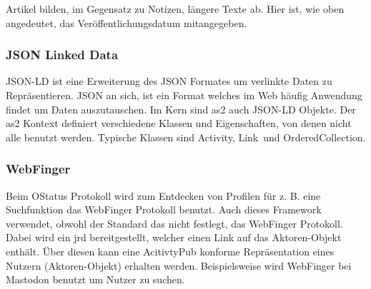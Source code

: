 {	Artikel bilden, im Gegensatz zu Notizen, längere Texte ab. Hier ist, wie oben angedeutet, das Veröffentlichungsdatum mitangegeben.\\
	
	\subsubsection{JSON Linked Data}
	\gls{JSON-LD} ist eine Erweiterung des JSON Formates um verlinkte Daten zu Repräsentieren. JSON an sich, ist ein Format welches im Web häufig Anwendung findet um Daten auszutauschen. Im Kern sind \gls{as2} auch \gls{JSON-LD} Objekte. Der \gls{as2} Kontext definiert verschiedene Klassen und Eigenschaften, von denen nicht alle benutzt werden. Typische Klassen sind \glqq Activity\grqq, \glqq Link\grqq~und \glqq OrderedCollection\grqq.\\
	
	\subsubsection{WebFinger}
	Beim OStatus Protokoll wird zum Entdecken von Profilen für z. B. eine Suchfunktion das WebFinger Protokoll benutzt. Auch dieses Framework verwendet, obwohl der Standard das nicht festlegt, das WebFinger Protokoll. Dabei wird ein \gls{jrd} bereitgestellt, welcher einen Link auf das Aktoren-Objekt enthält. Über diesen kann eine AcitivtyPub konforme Repräsentation eines Nutzern (Aktoren-Objekt) erhalten werden. Beispielsweise wird WebFinger bei Mastodon benutzt um Nutzer zu suchen.
}
